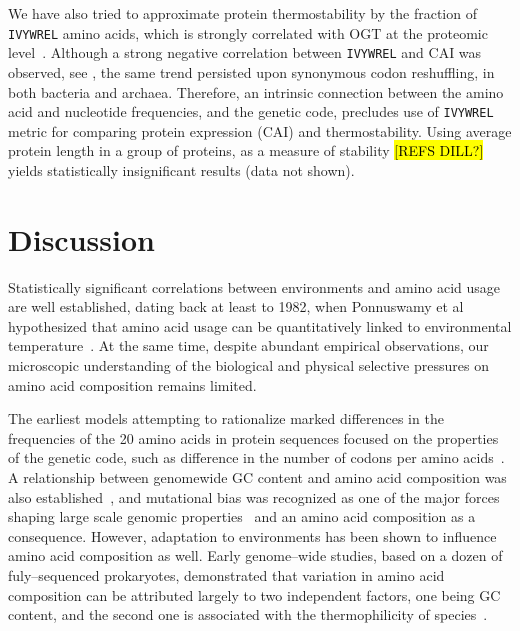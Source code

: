 \documentclass[10pt,letterpaper]{article}
\begin{document}
We have also tried to approximate protein thermostability by the fraction of \texttt{IVYWREL} amino acids, which is strongly correlated with OGT at the proteomic level~\cite{Zeldovich2007Protein}. Although a strong negative correlation between \texttt{IVYWREL} and CAI was observed, see , the same trend persisted upon synonymous codon reshuffling, in both bacteria and archaea. Therefore, an intrinsic connection between the amino acid and nucleotide frequencies, and the genetic code, precludes use of \texttt{IVYWREL} metric for comparing protein expression (CAI) and thermostability. Using average protein length in a group of proteins, as a measure of stability \hl{[REFS DILL?]} yields statistically insignificant results (data not shown).



\section*{Discussion}

Statistically significant correlations between environments and amino acid usage are well established, dating back at least to 1982, when Ponnuswamy et al hypothesized that amino acid usage can be quantitatively linked to environmental temperature~\cite{Ponnuswamy1986Amino}. At the same time, despite abundant empirical observations, our microscopic understanding of the biological and physical selective pressures on amino acid composition remains limited.

The earliest models attempting to rationalize marked differences in the frequencies of the 20 amino acids in protein sequences focused on the properties of the genetic code, such as difference in the number of codons per amino acids~\cite{Jukes1975Amino,King1969NonDarwinian}. A relationship between genomewide GC content and amino acid composition was also established~\cite{Knight2001Simple,Lightfield2011Across,Goncearenco2014Fundamental}, and mutational bias was recognized as one of the major forces shaping large scale genomic properties~\cite{Frank1999Asymmetric,Singer2000Nucleotide} and an amino acid composition as a consequence. However, adaptation to environments has been shown to influence amino acid composition as well. Early genome--wide studies, based on a dozen of fuly--sequenced prokaryotes, demonstrated that variation in amino acid composition can be attributed largely to two independent factors, one being GC content, and the second one is associated with the thermophilicity of species~\cite{Kreil2001Identification,Singer2003Thermophilic}.
\end{document}
